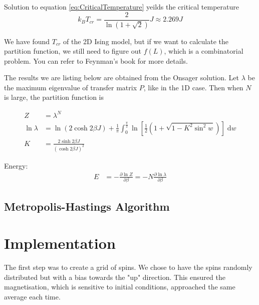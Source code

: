 \documentclass[11pt]{article}
\newcommand{\vd}{\mathrm{d}} %
\begin{document}
	Solution to equation \eqref{eq:CriticalTemperature} yeilds the critical temperature
	\begin{equation} \label{eq:CriticalTemperature}
		k_B T_{cr} = \frac{2}{\ln(1+\sqrt{2})}J \approx 2.269J
	\end{equation}

	We have found $T_{cr}$ of the 2D Ising model, but if we want to calculate the partition function,
	we still need to figure out $f(L)$, which is a combinatorial problem.
	You can refer to Feynman's book\cite{feynman1972statistical} for more details.

	The results we are listing below are obtained from the Onsager solution\cite{onsager_solution}.
	Let $\lambda$ be the maximum eigenvalue of transfer matrix $P$, like in the 1D case.
	Then when $N$ is large, the partition function is

	\begin{equation}
		\begin{split}
			Z &= \lambda^N \\
			\ln{\lambda} &= \ln{\left(2 \cosh{2\beta J}\right)} + \frac{1}{\pi}\int_0^{\frac{\pi}{2}} \ln{\left[\frac{1}{2}\left(1 + \sqrt{1 - K^2\sin^2{w}}\right)\right]\;\vd w} \\
			K &= \frac{2\sinh{2\beta J}}{\left(\cosh{2\beta J}\right)^2}
		\end{split}
	\end{equation}
	
	Energy:
	\begin{equation}
		\begin{split}
			E &= - \frac{\partial \ln{Z}}{\partial \beta} = -N\frac{\partial \ln{\lambda}}{\partial \beta}
		\end{split}
	\end{equation}

	\subsection{Metropolis-Hastings Algorithm}
	
	
	
	\section{Implementation}
	
	The first step was to create a grid of spins. We chose to have the spins randomly distributed but with a bias towards the "up" direction. This ensured the magnetisation, which is sensitive to initial conditions, approached the same average each time.\\
	
\end{document}
